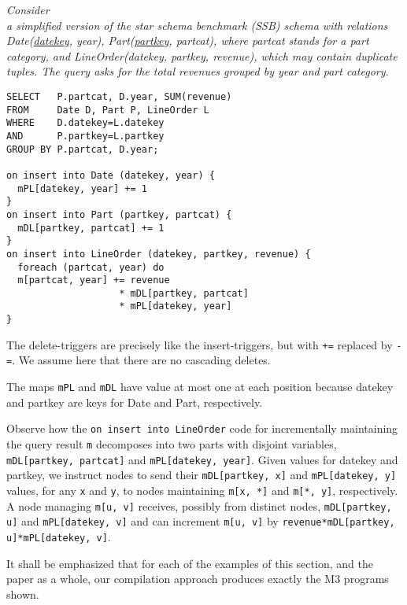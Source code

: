 \begin{example}\em
\label{ex:ssb}
Con\-sider \\ a simplified version of the star schema
benchmark (SSB) schema with relations Date(\underline{datekey}, year),
Part(\underline{partkey}, partcat), where partcat stands for a part category,
and LineOrder(datekey, partkey, revenue), which may contain duplicate tuples.
The query asks for the total revenues grouped by year and part category.

\begin{verbatim}
SELECT   P.partcat, D.year, SUM(revenue)
FROM     Date D, Part P, LineOrder L
WHERE    D.datekey=L.datekey
AND      P.partkey=L.partkey
GROUP BY P.partcat, D.year;

on insert into Date (datekey, year) {
  mPL[datekey, year] += 1
}
on insert into Part (partkey, partcat) {
  mDL[partkey, partcat] += 1
}
on insert into LineOrder (datekey, partkey, revenue) {
  foreach (partcat, year) do
  m[partcat, year] += revenue
                    * mDL[partkey, partcat]
                    * mPL[datekey, year]
}
\end{verbatim}
The delete-triggers are precisely
like the insert-triggers, but with {\tt +=} replaced by {\tt -=}.
We assume here that there are no cascading deletes.

The maps {\tt mPL} and {\tt mDL} have value at most
one at each position because datekey and partkey are keys for Date and Part,
respectively.

Observe how the {\tt on insert into LineOrder} code for incrementally
maintaining the query result {\tt m} decomposes into
two parts with disjoint variables, 
{\tt mDL[partkey, partcat]} and {\tt mPL[datekey, year]}.
Given values for datekey and partkey, we instruct nodes
to send their {\tt mDL[partkey, x]} and {\tt mPL[datekey, y]} values,
for any {\tt x} and {\tt y},
to nodes maintaining {\tt m[x, *]} and {\tt m[*, y]}, respectively.
A node managing {\tt m[u, v]} receives, possibly from distinct nodes,
{\tt mDL[partkey, u]} and {\tt mPL[datekey, v]}
and can increment {\tt m[u, v]} by
{\tt revenue*mDL[partkey, u]*mPL[datekey, v]}.
%
\punto
\end{example}


It shall be emphasized that for each of the examples of this section,
and the paper as a whole, our compilation approach produces exactly
the M3 programs shown.


